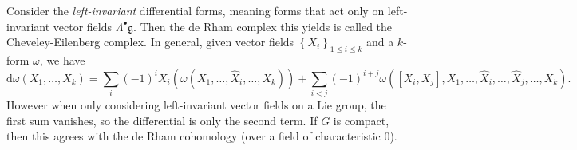 
Consider the \emph{left-invariant} differential forms, meaning forms that act only on left-invariant vector fields $\Lambda ^{\bullet} \mathfrak{g} $. Then the de Rham complex this yields is called the Cheveley-Eilenberg complex. In general, given vector fields $\left\{ X_i \right\} _{1\leq i\leq k} $ and a $k$-form $\omega $, we have
\[
	\mathrm{d} \omega (X_1, \ldots ,X_k)=\sum_{i} (-1)^i X_i(\omega (X_1, \ldots , \hat{X}_i, \ldots ,X_k)) + \sum_{i<j} (-1)^{i+j} \omega ([X_i,X_j], X_1, \ldots ,\hat{X}_i, \ldots ,\hat{X} _j, \ldots ,X_k)
.\]
However when only considering left-invariant vector fields on a Lie group, the first sum vanishes, so the differential is only the second term. If $G$ is compact, then this agrees with the de Rham cohomology (over a field of characteristic 0).
